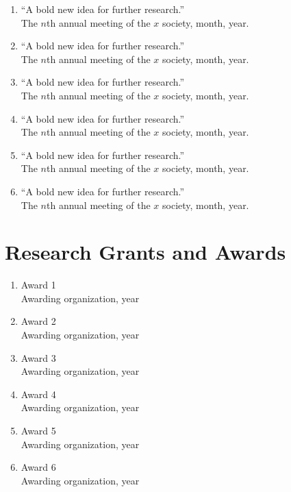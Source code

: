 \documentclass[11pt]{article}
\begin{document}
\begin{enumerate}[
  itemsep=-.45em,
  leftmargin=\dimexpr\leftmargini+1em\relax,
  labelindent=-1em,
  listparindent=-1em,
  itemindent=-1em
]
\item ``A bold new idea for further research.''\\
The $n$th annual meeting of the $x$ society, month, year.
\item ``A bold new idea for further research.''\\
The $n$th annual meeting of the $x$ society, month, year.
\item ``A bold new idea for further research.''\\
The $n$th annual meeting of the $x$ society, month, year.
\item ``A bold new idea for further research.''\\
The $n$th annual meeting of the $x$ society, month, year.
\item ``A bold new idea for further research.''\\
The $n$th annual meeting of the $x$ society, month, year.
\item ``A bold new idea for further research.''\\
The $n$th annual meeting of the $x$ society, month, year.
\end{enumerate}

\section*{Research Grants and Awards}

\begin{enumerate}[
  itemsep=-.4em,
  leftmargin=\dimexpr\leftmargini+1em\relax,
  labelindent=-1em,
  listparindent=-1em,
  itemindent=-1em
]

\item Award 1\\
Awarding organization, year
\item Award 2\\
Awarding organization, year
\item Award 3\\
Awarding organization, year
\item Award 4\\
Awarding organization, year
\item Award 5\\
Awarding organization, year
\item Award 6\\
Awarding organization, year
\end{enumerate}
\end{document}
